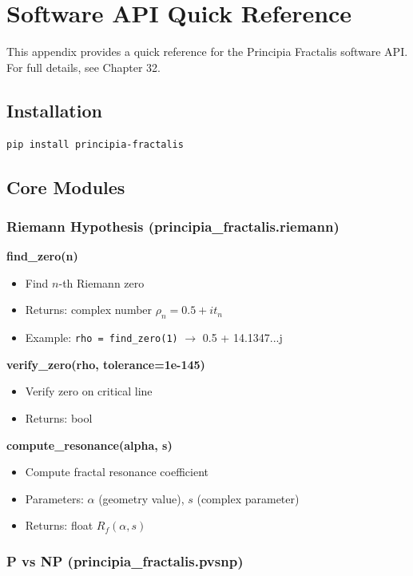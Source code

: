 \chapter{Software API Quick Reference}
\label{app:software}

This appendix provides a quick reference for the Principia Fractalis software API. For full details, see Chapter 32.

\section{Installation}

\begin{verbatim}
pip install principia-fractalis
\end{verbatim}

\section{Core Modules}

\subsection{Riemann Hypothesis (principia\_fractalis.riemann)}

\textbf{find\_zero(n)}
\begin{itemize}
\item Find $n$-th Riemann zero
\item Returns: complex number $\rho_n = 0.5 + it_n$
\item Example: \texttt{rho = find\_zero(1)} $\rightarrow$ 0.5 + 14.1347...j
\end{itemize}

\textbf{verify\_zero(rho, tolerance=1e-145)}
\begin{itemize}
\item Verify zero on critical line
\item Returns: bool
\end{itemize}

\textbf{compute\_resonance(alpha, s)}
\begin{itemize}
\item Compute fractal resonance coefficient
\item Parameters: $\alpha$ (geometry value), $s$ (complex parameter)
\item Returns: float $R_f(\alpha, s)$
\end{itemize}

\subsection{P vs NP (principia\_fractalis.pvsnp)}

